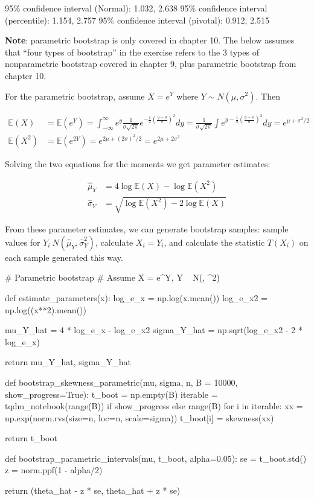 \begin{console}
95\% confidence interval (Normal):        1.032, 2.638
95\% confidence interval (percentile):    1.154, 2.757
95\% confidence interval (pivotal):       0.912, 2.515
\end{console}

\textbf{Note}: parametric bootstrap is only covered in chapter 10. The
below assumes that ``four types of bootstrap'' in the exercise refers to
the 3 types of nonparametric bootstrap covered in chapter 9, plus
parametric bootstrap from chapter 10.

For the parametric bootstrap, assume \(X = e^Y\) where
\(Y \sim N(\mu, \sigma^2)\). Then

\begin{align}
\mathbb{E}(X) & = \mathbb{E}(e^Y) = \int_{-\infty}^\infty e^y \frac{1}{\sigma \sqrt{2 \pi}} e^{-\frac{1}{2} \left(\frac{y - \mu}{\sigma} \right)^2} dy = \frac{1}{\sigma \sqrt{2 \pi}} \int e^{y - \frac{1}{2}\left(\frac{y - \mu}{\sigma}\right)^2} dy = e^{\mu + \sigma^2/2} \\
\mathbb{E}(X^2) &= \mathbb{E}(e^{2Y}) = e^{2\mu + (2\sigma)^2/2} = e^{2\mu + 2\sigma^2}
\end{align}

Solving the two equations for the moments we get parameter estimates:

\begin{align}
\hat{\mu}_Y & = 4 \log \mathbb{E}(X) - \log \mathbb{E}(X^2) \\
\hat{\sigma}_Y & = \sqrt{\log \mathbb{E}(X^2) - 2 \log \mathbb{E}(X)}
\end{align}

From these parameter estimates, we can generate bootstrap samples:
sample values for \(Y_i ~ N(\hat{\mu}_Y, \hat{\sigma}_Y^2)\), calculate
\(X_i = Y_i\), and calculate the statistic \(T(X_i)\) on each sample
generated this way.

\begin{python}
# Parametric bootstrap
# Assume X = e^Y, Y ~ N(\mu, \sigma^2)

def estimate_parameters(x):
    log_e_x = np.log(x.mean())
    log_e_x2 = np.log((x**2).mean())
    
    mu_Y_hat = 4 * log_e_x - log_e_x2
    sigma_Y_hat = np.sqrt(log_e_x2 - 2 * log_e_x)
    
    return mu_Y_hat, sigma_Y_hat

def bootstrap_skewness_parametric(mu, sigma, n, B = 10000, show_progress=True):
    t_boot = np.empty(B)
    iterable = tqdm_notebook(range(B)) if show_progress else range(B)
    for i in iterable:
        xx = np.exp(norm.rvs(size=n, loc=n, scale=sigma))
        t_boot[i] = skewness(xx)
        
    return t_boot

def bootstrap_parametric_intervals(mu, t_boot, alpha=0.05):
    se = t_boot.std()
    z = norm.ppf(1 - alpha/2)
    
    return (theta_hat - z * se, theta_hat + z * se)
\end{python}


